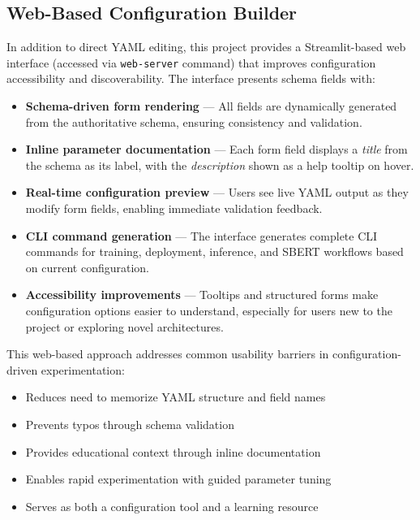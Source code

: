 \subsection{Web-Based Configuration Builder}

In addition to direct YAML editing, this project provides a Streamlit-based web interface (accessed via \texttt{web-server} command) that improves configuration accessibility and discoverability. The interface presents schema fields with:

\begin{itemize}[leftmargin=*]
    \item \textbf{Schema-driven form rendering} --- All fields are dynamically generated from the authoritative schema, ensuring consistency and validation.
    \item \textbf{Inline parameter documentation} --- Each form field displays a \emph{title} from the schema as its label, with the \emph{description} shown as a help tooltip on hover.
    \item \textbf{Real-time configuration preview} --- Users see live YAML output as they modify form fields, enabling immediate validation feedback.
    \item \textbf{CLI command generation} --- The interface generates complete CLI commands for training, deployment, inference, and SBERT workflows based on current configuration.
    \item \textbf{Accessibility improvements} --- Tooltips and structured forms make configuration options easier to understand, especially for users new to the project or exploring novel architectures.
\end{itemize}

This web-based approach addresses common usability barriers in configuration-driven experimentation:
\begin{itemize}[leftmargin=*]
    \item Reduces need to memorize YAML structure and field names
    \item Prevents typos through schema validation
    \item Provides educational context through inline documentation
    \item Enables rapid experimentation with guided parameter tuning
    \item Serves as both a configuration tool and a learning resource
\end{itemize}

